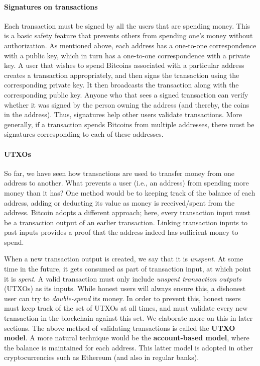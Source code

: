 \documentclass{article}
\begin{document}
\paragraph{Signatures on transactions}
Each transaction must be signed by all the users that are spending money. This is a basic safety feature that prevents others from spending one's money without authorization. As mentioned above, each address has a one-to-one correspondence with a public key, which in turn has a one-to-one correspondence with a private key. A user that wishes to spend Bitcoins associated with a particular address creates a transaction appropriately, and then signs the transaction using the corresponding private key. It then broadcasts the transaction along with the corresponding public key. Anyone who that sees a signed transaction can verify whether it was signed by the person owning the address (and thereby, the coins in the address). Thus, signatures help other users validate transactions. More generally, if a transaction spends Bitcoins from multiple addresses, there must be signatures corresponding to each of these addresses.

\paragraph{UTXOs} So far, we have seen how transactions are used to transfer money from one address to another. What prevents a user (i.e., an address) from spending more money than it has? One method would be to keeping track of the balance of each address, adding or deducting its value as money is received/spent from the address. Bitcoin adopts a different approach; here, every transaction input must be a transaction output of an earlier transaction. Linking transaction inputs to past inputs provides a proof that the address indeed has sufficient money to spend. 

When a new transaction output is created, we say that it is \textit{unspent}. At some time in the future, it gets consumed as part of transaction input, at which point it is \textit{spent}. A valid transaction must only include \textit{unspent transaction outputs} (UTXOs) as its inputs. While honest users will always ensure this, a dishonest user can try to \textit{double-spend} its money. In order to prevent this, honest users must keep track of the set of UTXOs at all times, and must validate every new transaction in the blockchain against this set. We elaborate more on this in later sections. The above method of validating transactions is called the \textbf{UTXO model}. A more natural technique would be the \textbf{account-based model}, where the balance is maintained for each address. This latter model is adopted in other cryptocurrencies such as Ethereum (and also in regular banks).
\end{document}

